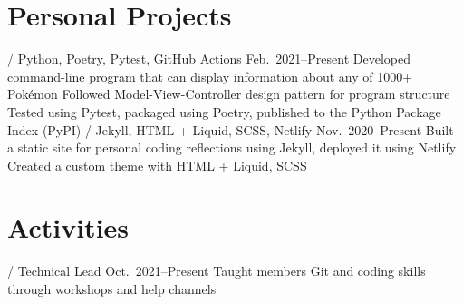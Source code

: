 \section{Personal Projects}
\begin{doutline}
    \1[Pokésummary] / Python, Poetry, Pytest, GitHub Actions
    \hfill Feb.\ 2021--Present
        \2 Developed command-line program that can display information about any of 1000+ Pokémon
            \3 Followed Model-View-Controller design pattern for program structure
            \3 Tested using Pytest, packaged using Poetry, published to the Python Package Index (PyPI)
     / Jekyll, HTML + Liquid, SCSS, Netlify
    \hfill Nov.\ 2020--Present
        \2 Built a static site for personal coding reflections using Jekyll, deployed it using Netlify
            \3 Created a custom theme with HTML + Liquid, SCSS
\end{doutline}

\section{Activities}
\begin{doutline}
     / Technical Lead
    \hfill Oct.\ 2021--Present
        \2 Taught members Git and coding skills through workshops and help channels
\end{doutline}
